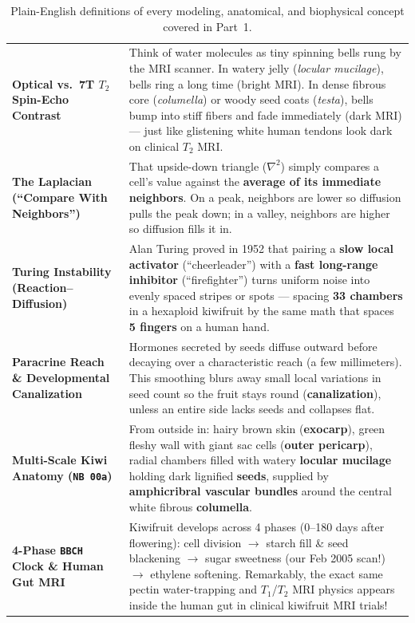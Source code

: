 \documentclass[10.5pt,a4paper]{article}
\begin{document}
\begin{table}[H]
\begin{tabularx}{\textwidth}{L{3.55cm} Y}
\textbf{Optical vs.\ 7T $T_2$ Spin-Echo Contrast} & Think of water molecules as tiny spinning bells rung by the MRI scanner. In watery jelly (\emph{locular mucilage}), bells ring a long time (bright MRI). In dense fibrous core (\emph{columella}) or woody seed coats (\emph{testa}), bells bump into stiff fibers and fade immediately (dark MRI) --- just like glistening white human tendons look dark on clinical $T_2$ MRI. \\
\textbf{The Laplacian (``Compare With Neighbors'')} & That upside-down triangle ($\nabla^2$) simply compares a cell's value against the \textbf{average of its immediate neighbors}. On a peak, neighbors are lower so diffusion pulls the peak down; in a valley, neighbors are higher so diffusion fills it in. \\
\textbf{Turing Instability (Reaction--Diffusion)} & Alan Turing proved in 1952 that pairing a \textbf{slow local activator} (``cheerleader'') with a \textbf{fast long-range inhibitor} (``firefighter'') turns uniform noise into evenly spaced stripes or spots --- spacing \textbf{33 chambers} in a hexaploid kiwifruit by the same math that spaces \textbf{5 fingers} on a human hand. \\
\textbf{Paracrine Reach \& Developmental Canalization} & Hormones secreted by seeds diffuse outward before decaying over a characteristic reach (a few millimeters). This smoothing blurs away small local variations in seed count so the fruit stays round (\textbf{canalization}), unless an entire side lacks seeds and collapses flat. \\
\textbf{Multi-Scale Kiwi Anatomy (\texttt{NB 00a})} & From outside in: hairy brown skin (\textbf{exocarp}), green fleshy wall with giant sac cells (\textbf{outer pericarp}), radial chambers filled with watery \textbf{locular mucilage} holding dark lignified \textbf{seeds}, supplied by \textbf{amphicribral vascular bundles} around the central white fibrous \textbf{columella}. \\
\textbf{4-Phase \texttt{BBCH} Clock \& Human Gut MRI} & Kiwifruit develops across 4 phases (0--180 days after flowering): cell division $\to$ starch fill \& seed blackening $\to$ sugar sweetness (our Feb 2005 scan!) $\to$ ethylene softening. Remarkably, the exact same pectin water-trapping and $T_1$/$T_2$ MRI physics appears inside the human gut in clinical kiwifruit MRI trials! \\
\bottomrule
\end{tabularx}
\caption{Plain-English definitions of every modeling, anatomical, and biophysical concept covered in Part~1.}
\label{tab:lab5-p1-defs}
\end{table}
\end{document}
